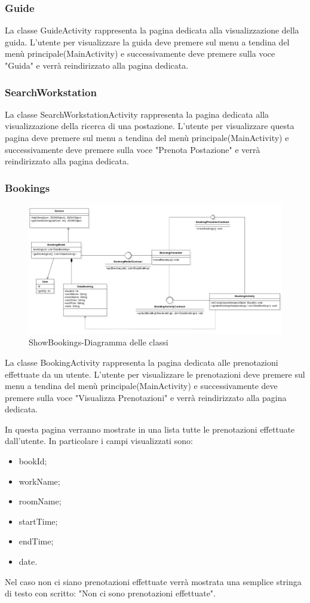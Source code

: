\subsubsection{Guide}
La classe GuideActivity rappresenta la pagina dedicata alla visualizzazione della guida.
L'utente per visualizzare la guida deve premere sul menu a tendina del menù principale(MainActivity) e successivamente deve premere sulla voce "Guida" e verrà reindirizzato alla pagina dedicata.

\subsubsection{SearchWorkstation}
La classe SearchWorkstationActivity rappresenta la pagina dedicata alla visualizzazione della ricerca di una postazione.
L'utente per visualizzare questa pagina deve premere sul menu a tendina del menù principale(MainActivity) e successivamente deve premere sulla voce "Prenota Postazione" e verrà reindirizzato alla pagina dedicata.

\subsubsection{Bookings}
\begin{figure}[H]
	\centering
	\includegraphics[width=16cm]{res/images/ShowBookingsClass.png}
	\caption{ShowBookings-Diagramma delle classi}
	\label{fig:ShowBookings-Diagramma delle classi}
\end{figure}
La classe BookingActivity rappresenta la pagina dedicata alle prenotazioni effettuate da un utente. L'utente per visualizzare le prenotazioni deve premere sul menu a tendina del menù principale(MainActivity) e successivamente deve premere sulla voce "Visualizza Prenotazioni" e verrà reindirizzato alla pagina dedicata.

In questa pagina verranno mostrate in una lista tutte le prenotazioni effettuate dall'utente. In particolare i campi visualizzati sono: 
\begin{itemize}
	\item bookId; 
	\item workName; 
	\item roomName; 
	\item startTime; 
	\item endTime; 
	\item date. 
\end{itemize}
Nel caso non ci siano prenotazioni effettuate verrà mostrata una semplice stringa di testo con scritto: "Non ci sono prenotazioni effettuate".

